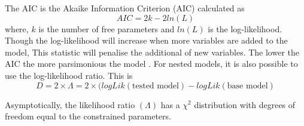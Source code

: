 \documentclass[12pt, a4paper, oneside]{article} %
\begin{document}
The AIC is the Akaike Information Criterion (AIC) calculated as 
\begin{equation}
AIC = 2k - 2ln(L) 
\end{equation}
where, $k$ is the number of free parameters and $ln(L)$ is the log-likelihood.  Though the log-likelihood will increase when more variables are added to the model, This statistic will penalise the additional of new variables.  The lower the AIC the more parsimonious the model \citet{AIC}. For nested models, it is also possible to use the log-likelihood ratio.  This is 
\begin{equation}
D = 2 \times \Lambda = 2 \times (logLik(\text{tested model}) - logLik(\text{base model})
\end{equation}

Asymptotically, the likelihood ratio $(\Lambda)$ has a $\chi^2$ distribution with degrees of freedom equal to the constrained parameters. 
\end{document}
